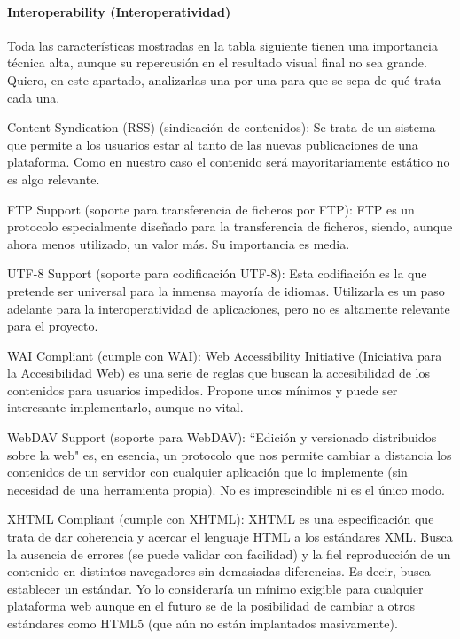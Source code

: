 \paragraph{Interoperability (Interoperatividad)}
\par Toda las características mostradas en la tabla siguiente tienen una importancia técnica alta, aunque su repercusión en el resultado visual final no sea grande. Quiero, en este apartado, analizarlas una por una para que se sepa de qué trata cada una.

\par Content Syndication (RSS) (sindicación de contenidos): Se trata de un sistema que permite a los usuarios estar al tanto de las nuevas publicaciones de una plataforma. Como en nuestro caso el contenido será mayoritariamente estático no es algo relevante.

\par FTP Support (soporte para transferencia de ficheros por FTP): FTP es un protocolo especialmente diseñado para la transferencia de ficheros, siendo, aunque ahora menos utilizado, un valor más. Su importancia es media.

\par UTF-8 Support (soporte para codificación UTF-8): Esta codifiación es la que pretende ser universal para la inmensa mayoría de idiomas. Utilizarla es un paso adelante para la interoperatividad de aplicaciones, pero no es altamente relevante para el proyecto.

\par WAI Compliant (cumple con WAI): Web Accessibility Initiative (Iniciativa para la Accesibilidad Web) es una serie de reglas que buscan la accesibilidad de los contenidos para usuarios impedidos. Propone unos mínimos y puede ser interesante implementarlo, aunque no vital.

\par WebDAV Support (soporte para WebDAV): ``Edición y versionado distribuidos sobre la web" es, en esencia, un protocolo que nos permite cambiar a distancia los contenidos de un servidor con cualquier aplicación que lo implemente (sin necesidad de una herramienta propia). No es imprescindible ni es el único modo.

\par XHTML Compliant (cumple con XHTML): XHTML es una especificación que trata de dar coherencia y acercar el lenguaje HTML a los estándares XML. Busca la ausencia de errores (se puede validar con facilidad) y la fiel reproducción de un contenido en distintos navegadores sin demasiadas diferencias. Es decir, busca establecer un estándar. Yo lo consideraría un mínimo exigible para cualquier plataforma web aunque en el futuro se de la posibilidad de cambiar a otros estándares como HTML5 (que aún no están implantados masivamente).


